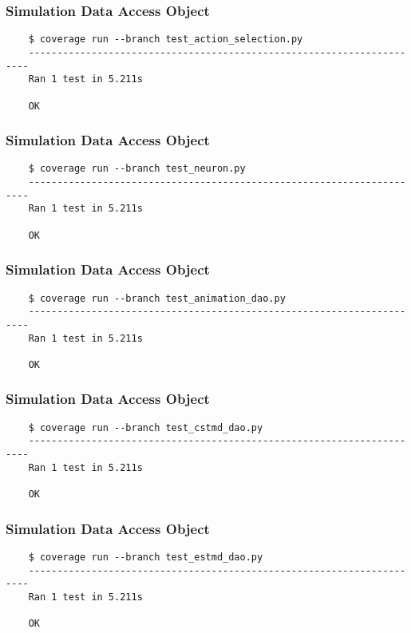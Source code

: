 \documentclass[a4paper,11pt]{article}
\begin{document}
\subsubsection*{{\hspace{6mm}}Simulation Data Access Object}
\begin{verbatim}
    $ coverage run --branch test_action_selection.py
    ----------------------------------------------------------------------
    Ran 1 test in 5.211s

    OK
\end{verbatim} 

\subsubsection*{{\hspace{6mm}}Simulation Data Access Object}
\begin{verbatim}
    $ coverage run --branch test_neuron.py
    ----------------------------------------------------------------------
    Ran 1 test in 5.211s

    OK
\end{verbatim}   
    
\subsubsection*{{\hspace{6mm}}Simulation Data Access Object}
\begin{verbatim}
    $ coverage run --branch test_animation_dao.py
    ----------------------------------------------------------------------
    Ran 1 test in 5.211s

    OK
\end{verbatim}

\subsubsection*{{\hspace{6mm}}Simulation Data Access Object}
\begin{verbatim}
    $ coverage run --branch test_cstmd_dao.py
    ----------------------------------------------------------------------
    Ran 1 test in 5.211s

    OK
\end{verbatim}
  
\subsubsection*{{\hspace{6mm}}Simulation Data Access Object}
\begin{verbatim}
    $ coverage run --branch test_estmd_dao.py
    ----------------------------------------------------------------------
    Ran 1 test in 5.211s

    OK
\end{verbatim}  
\end{document}
